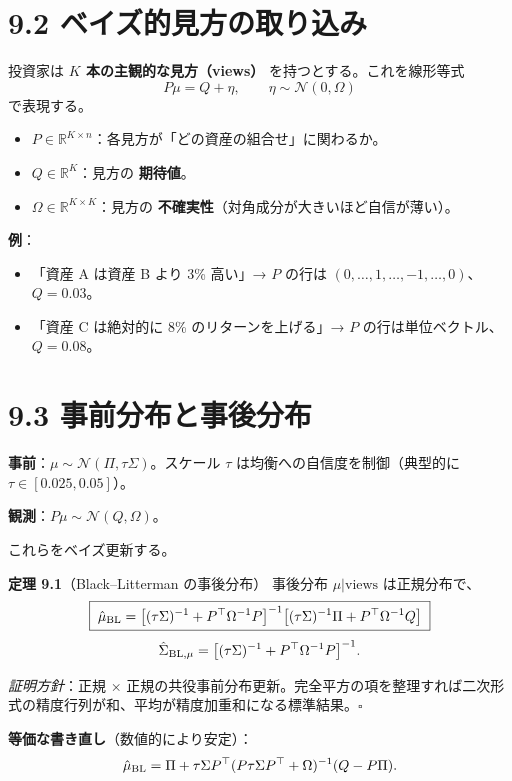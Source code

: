 \documentclass[11pt,a4paper]{report}
\begin{document}
\section{9.2 ベイズ的見方の取り込み}

投資家は \textbf{$K$ 本の主観的な見方（views）} を持つとする。これを線形等式 \[ P \mu = Q + \eta, \qquad \eta \sim \mathcal{N}(0, \Omega) \] で表現する。
\begin{itemize}
\item $P \in \mathbb{R}^{K\times n}$：各見方が「どの資産の組合せ」に関わるか。
\item $Q \in \mathbb{R}^K$：見方の \textbf{期待値}。
\item $\Omega \in \mathbb{R}^{K\times K}$：見方の \textbf{不確実性}（対角成分が大きいほど自信が薄い）。
\end{itemize}

\textbf{例}：
\begin{itemize}
\item 「資産 A は資産 B より 3\% 高い」→ $P$ の行は $(0, \dots, 1, \dots, -1, \dots, 0)$、$Q = 0.03$。
\item 「資産 C は絶対的に 8\% のリターンを上げる」→ $P$ の行は単位ベクトル、$Q = 0.08$。
\end{itemize}

\section{9.3 事前分布と事後分布}

\textbf{事前}：$\mu \sim \mathcal{N}(\Pi, \tau \Sigma)$。スケール $\tau$ は均衡への自信度を制御（典型的に $\tau \in [0.025, 0.05]$）。

\textbf{観測}：$P \mu \sim \mathcal{N}(Q, \Omega)$。

これらをベイズ更新する。

\textbf{定理 9.1}（Black–Litterman の事後分布） 事後分布 $\mu | \text{views}$ は正規分布で、 \[ \boxed{\; \hat\mu_{\rm BL} = \bigl[(\tau\Sigma)^{-1} + P^\top \Omega^{-1} P \bigr]^{-1}\bigl[(\tau\Sigma)^{-1} \Pi + P^\top \Omega^{-1} Q\bigr] \;} \] \[ \hat\Sigma_{\rm BL,\mu} = \bigl[(\tau\Sigma)^{-1} + P^\top \Omega^{-1} P\bigr]^{-1}. \]

\emph{証明方針}：正規 × 正規の共役事前分布更新。完全平方の項を整理すれば二次形式の精度行列が和、平均が精度加重和になる標準結果。$\square$

\textbf{等価な書き直し}（数値的により安定）： \[ \hat\mu_{\rm BL} = \Pi + \tau\Sigma P^\top (P \tau\Sigma P^\top + \Omega)^{-1} (Q - P\Pi). \]
\end{document}
